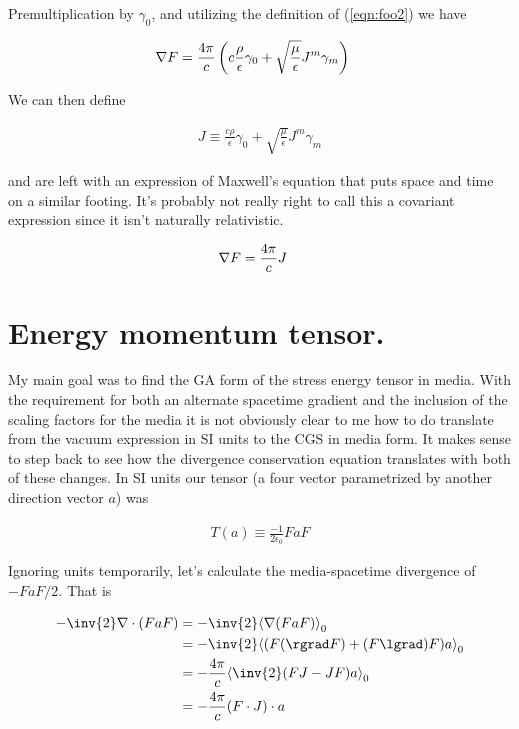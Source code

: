 Premultiplication by $\gamma_0$, and utilizing the definition of (\ref{eqn:foo2}) we have

\begin{align}\label{eqn:foo8}
\nabla F &= \frac{4 \pi}{c} \left( c \frac{\rho}{\epsilon} \gamma_0 + \sqrt{\frac{\mu}{\epsilon}} J^m \gamma_m \right)
\end{align}

We can then define

\begin{align}\label{eqn:foo9}
J \equiv \frac{c \rho}{\epsilon} \gamma_0 + \sqrt{\frac{\mu}{\epsilon}} J^m \gamma_m
\end{align}

and are left with an expression of Maxwell's equation that puts space and time on a similar footing.  It's probably not really right to call this a covariant expression since it isn't naturally relativistic.

\begin{align}\label{eqn:foo10}
\nabla F &= \frac{4 \pi}{c} J
\end{align}

\section{Energy momentum tensor.}

My main goal was to find the GA form of the stress energy tensor in media.  With the requirement for both an alternate spacetime gradient and the inclusion of the scaling factors for the media it is not obviously clear to me how to do translate from the vacuum expression in SI units to the CGS in media form.  It makes sense to step back to see how the divergence conservation equation translates with both of these changes.  In SI units our tensor (a four vector parametrized by another direction vector $a$) was

\begin{align}\label{eqn:foo11}
T(a) \equiv \frac{-1}{2\epsilon_0} F a F
\end{align}

Ignoring units temporarily, let's calculate the media-spacetime divergence of $-FaF/2$.  That is

\begin{align*}
-\inv{2} \grad \cdot (FaF)
&=
-\inv{2} \gpgradezero{\grad (FaF)} \\
&=
-\inv{2} \gpgradezero{(F(\rgrad F) + (F\lgrad)F) a} \\
&=
-\frac{4\pi}{c} \gpgradezero{\inv{2}(F J - J F) a} \\
&=
-\frac{4\pi}{c} (F \cdot J) \cdot a \\
\end{align*}

